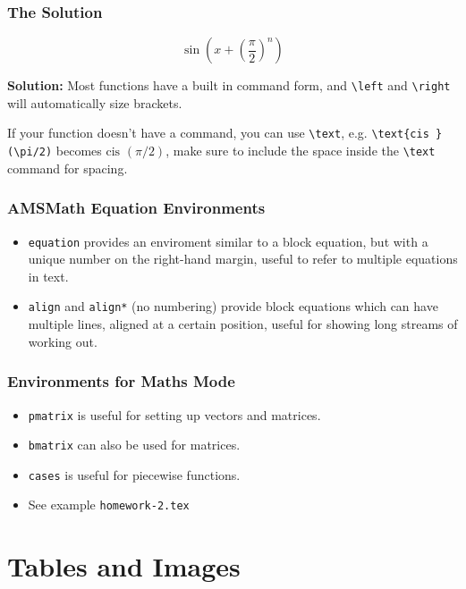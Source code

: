 \documentclass{beamer}
\begin{document}
\begin{frame}
	\frametitle{The Solution}
		\begin{center}
			
			\[
				\sin\left(x+\left(\frac{\pi}{2}\right)^n\right)
			\]
		\end{center}

		\textbf{Solution:} Most functions have a built in command form, and \texttt{\textbackslash{}left} and \texttt{\textbackslash{}right} will automatically size brackets.

		If your function doesn't have a command, you can use \texttt{\textbackslash{}text}, e.g. \texttt{\textbackslash{}text\{cis \}(\textbackslash{}pi/2)} becomes $\text{cis }(\pi/2)$, make sure to include the space inside the \texttt{\textbackslash{}text} command for spacing.
\end{frame}

\begin{frame}
	\frametitle{AMSMath Equation Environments}
	\begin{itemize}
		\item \texttt{equation} provides an enviroment similar to a block equation, but with a unique number on the right-hand margin, useful to refer to multiple equations in text.
		\item \texttt{align} and \texttt{align*} (no numbering) provide block equations which can have multiple lines, aligned at a certain position, useful for showing long streams of working out.
	\end{itemize}
\end{frame}

\begin{frame}
	\frametitle{Environments for Maths Mode}
	\begin{itemize}
		\item \texttt{pmatrix} is useful for setting up vectors and matrices.
		\item \texttt{bmatrix} can also be used for matrices.
		\item \texttt{cases} is useful for piecewise functions.
		\item See example \texttt{homework-2.tex}
	\end{itemize}
\end{frame}

\section{Tables and Images}
\end{document}
